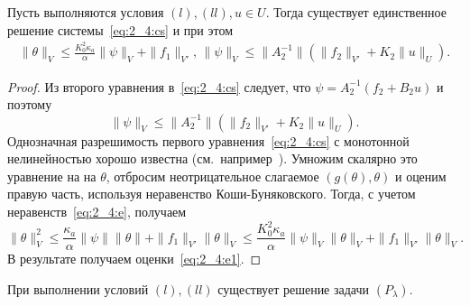 \begin{lemma}
    \label{lm:2_4:1}
    Пусть выполняются условия $(l), (ll), u \in U$.
    Тогда существует единственное решение системы~\eqref{eq:2_4:cs} и при этом
    \begin{equation}
        \label{eq:2_4:e1}
        \begin{aligned}
            \|\theta\|_V \leq
            \frac{K_0^2\kappa_a}{\alpha}\|\psi\|_V+\|f_1\|_{V'}, \,
            \|\psi\|_V\leq \|A_2^{-1}\| \left(\|f_2\|_{V'}+K_2\|u\|_U\right).
        \end{aligned}
    \end{equation}
\end{lemma}

\begin{proof}
    Из второго уравнения в~\eqref{eq:2_4:cs} следует, что $\psi = A_2^{-1}(f_2+B_2 u)$
    и поэтому
    \[
        \|\psi\|_V\leq \|A_2^{-1}\|\left(\|f_2\|_{V'}+K_2\|u\|_U\right).
    \]
    Однозначная разрешимость первого уравнения~\eqref{eq:2_4:cs} с монотонной
    нелинейностью хорошо известна (см.\ например~\cite{Kufner}).
    Умножим скалярно это уравнение на на $\theta$,
    отбросим неотрицательное слагаемое $(g(\theta),\theta)$ и оценим правую часть,
    используя неравенство Коши-Буняковского.
    Тогда, с учетом неравенств~\eqref{eq:2_4:e}, получаем
    \[
        \|\theta\|^2_V \leq \frac{\kappa_a}{\alpha}\|\psi\|\|\theta\|
        +\|f_1\|_{V'}\|\theta\|_V \leq
        \frac{K_0^2\kappa_a}{\alpha}\|\psi\|_V\|\theta\|_V
        +\|f_1\|_{V'}\|\theta\|_V.
    \]
    В результате получаем оценки~\eqref{eq:2_4:e1}.
\end{proof}


\begin{theorem}
    \label{th:2_4:1}
    При выполнении условий $(l), (ll)$ существует решение задачи $(P_\lambda)$.
\end{theorem}

